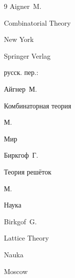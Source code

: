 \begin{thebibliography}{9}
\by Aigner~M.

\book Combinatorial Theory

\publaddr New York

\publ Springer Verlag



\rtransl русск. пер.: {} 

\by Айг\-нер~М.

\book Комбинаторная теория

\publaddr М.

\publ Мир






\by Биркгоф~Г.

\book Теория решёток

\publaddr М.

\publ Наука



\misctransl

\by Birkgof~G.

\book Lattice Theory

\publ Nauka

\publaddr Moscow 







\end{thebibliography}



\noindent

\hskip6.5cm \thedate \par\noindent

\hskip6.5cm\therevdate









\vspace{-5mm}



\makeengtitle







 \newpage





%

